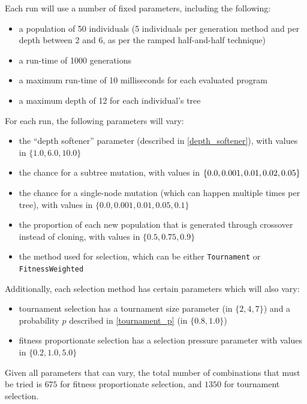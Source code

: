 \documentclass{report}
\begin{document}
Each run will use a number of fixed parameters, including the following:

\begin{itemize}
    \item a population of 50 individuals (5 individuals per generation method and per depth between 2 and 6, as per the ramped half-and-half technique)
    \item a run-time of 1000 generations
    \item a maximum run-time of 10 milliseconds for each evaluated program
    \item a maximum depth of 12 for each individual's tree
\end{itemize}

For each run, the following parameters will vary:

\begin{itemize}
    \item the ``depth softener'' parameter (described in \autoref{depth_softener}), with values in $\{1.0, 6.0, 10.0\}$
    \item the chance for a subtree mutation, with values in $\{0.0, 0.001, 0.01, \linebreak 0.02, 0.05\}$
    \item the chance for a single-node mutation (which can happen multiple times per tree), with values in $\{0.0, 0.001, 0.01, 0.05, 0.1\}$
    \item the proportion of each new population that is generated through crossover instead of cloning, with values in $\{0.5, 0.75, 0.9\}$
    \item the method used for selection, which can be either \verb|Tournament| or \linebreak
    \verb|FitnessWeighted|
\end{itemize}

Additionally, each selection method has certain parameters which will also vary:

\begin{itemize}
    \item tournament selection has a tournament size parameter (in $\{2, 4, 7\}$) and a probability $p$ described in \autoref{tournament_p} (in $\{0.8, 1.0\}$)
    \item fitness proportionate selection has a selection pressure parameter with values in $\{0.2, 1.0, 5.0\}$
\end{itemize}

Given all parameters that can vary, the total number of combinations that must be tried is $675$ for fitness proportionate selection, and $1350$ for tournament selection.
\end{document}
